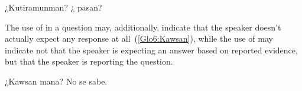 %
{¿Kutiramunman? ¿ pasan?}%
{}%
{}{}%

\noindent
The use of  in a question may, additionally, indicate that the speaker doesn’t actually expect any response at all~(\ref{Glo6:Kawsan}), while the use of  may indicate not that the speaker is expecting an answer based on reported evidence, but that the speaker is reporting the question.

%
{¿Kawsan mana? No se sabe.}%
{}%
{}{}%
